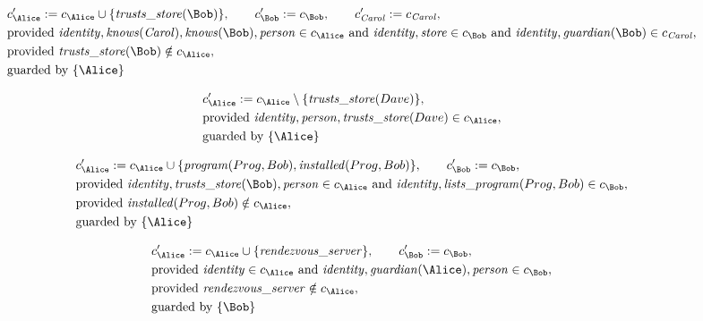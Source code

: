 \begin{align*}
&
c'_
{
\Alice
}
 := 
c_
{
\Alice
}
 \cup 
\{
\mathit{\detokenize{
trusts_store
}}
(
\Bob
)
\}
, \qquad 
c'_
{
\Bob
}
 := 
c_
{
\Bob
}
, \qquad 
c'_
{
\mathit{Carol}
}
 := 
c_
{
\mathit{Carol}
}
,\\
&
\text{provided } 
\mathit{\detokenize{
identity
}}
,
\mathit{\detokenize{
knows
}}
(
\mathit{Carol}
)
,
\mathit{\detokenize{
knows
}}
(
\Bob
)
,
\mathit{\detokenize{
person
}}
 \in c_
{
\Alice
}
 \text{ and } 
\mathit{\detokenize{
identity
}}
,
\mathit{\detokenize{
store
}}
 \in c_
{
\Bob
}
 \text{ and } 
\mathit{\detokenize{
identity
}}
,
\mathit{\detokenize{
guardian
}}
(
\Bob
)
 \in c_
{
\mathit{Carol}
}
,\\
&
\text{provided } 
\mathit{\detokenize{
trusts_store
}}
(
\Bob
)
 \notin c_
{
\Alice
}
,\\
&
\text{guarded by } \{
\Alice
\}
\end{align*}

\begin{align*}
&
c'_
{
\Alice
}
 := 
c_
{
\Alice
}
 \setminus 
\{
\mathit{\detokenize{
trusts_store
}}
(
Dave
)
\}
,\\
&
\text{provided } 
\mathit{\detokenize{
identity
}}
,
\mathit{\detokenize{
person
}}
,
\mathit{\detokenize{
trusts_store
}}
(
Dave
)
 \in c_
{
\Alice
}
,\\
&
\text{guarded by } \{
\Alice
\}
\end{align*}

\begin{align*}
&
c'_
{
\Alice
}
 := 
c_
{
\Alice
}
 \cup 
\{
\mathit{\detokenize{
program
}}
(
Prog
,
Bob
)
,
\mathit{\detokenize{
installed
}}
(
Prog
,
Bob
)
\}
, \qquad 
c'_
{
\Bob
}
 := 
c_
{
\Bob
}
,\\
&
\text{provided } 
\mathit{\detokenize{
identity
}}
,
\mathit{\detokenize{
trusts_store
}}
(
\Bob
)
,
\mathit{\detokenize{
person
}}
 \in c_
{
\Alice
}
 \text{ and } 
\mathit{\detokenize{
identity
}}
,
\mathit{\detokenize{
lists_program
}}
(
Prog
,
Bob
)
 \in c_
{
\Bob
}
,\\
&
\text{provided } 
\mathit{\detokenize{
installed
}}
(
Prog
,
Bob
)
 \notin c_
{
\Alice
}
,\\
&
\text{guarded by } \{
\Alice
\}
\end{align*}

\begin{align*}
&
c'_
{
\Alice
}
 := 
c_
{
\Alice
}
 \cup 
\{
\mathit{\detokenize{
rendezvous_server
}}
\}
, \qquad 
c'_
{
\Bob
}
 := 
c_
{
\Bob
}
,\\
&
\text{provided } 
\mathit{\detokenize{
identity
}}
 \in c_
{
\Alice
}
 \text{ and } 
\mathit{\detokenize{
identity
}}
,
\mathit{\detokenize{
guardian
}}
(
\Alice
)
,
\mathit{\detokenize{
person
}}
 \in c_
{
\Bob
}
,\\
&
\text{provided } 
\mathit{\detokenize{
rendezvous_server
}}
 \notin c_
{
\Alice
}
,\\
&
\text{guarded by } \{
\Bob
\}
\end{align*}
